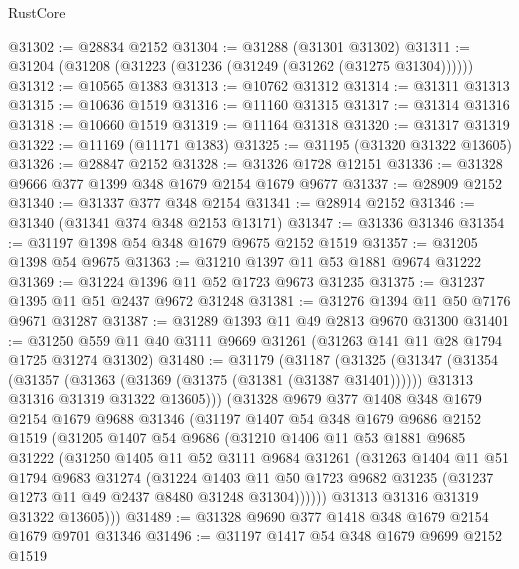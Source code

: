 \begin{lexlean}{RustCore}
\begin{coremodule}
@31302 := @28834 @2152
@31304 := @31288 (@31301 @31302)
@31311 := @31204 (@31208 (@31223 (@31236 (@31249 (@31262 (@31275 @31304))))))
@31312 := @10565 @1383
@31313 := @10762 @31312
@31314 := @31311 @31313
@31315 := @10636 @1519
@31316 := @11160 @31315
@31317 := @31314 @31316
@31318 := @10660 @1519
@31319 := @11164 @31318
@31320 := @31317 @31319
@31322 := @11169 (@11171 @1383)
@31325 := @31195 (@31320 @31322 @13605)
@31326 := @28847 @2152
@31328 := @31326 @1728 @12151
@31336 := @31328 @9666 @377 @1399 @348 @1679 @2154 @1679 @9677
@31337 := @28909 @2152
@31340 := @31337 @377 @348 @2154
@31341 := @28914 @2152
@31346 := @31340 (@31341 @374 @348 @2153 @13171)
@31347 := @31336 @31346
@31354 := @31197 @1398 @54 @348 @1679 @9675 @2152 @1519
@31357 := @31205 @1398 @54 @9675
@31363 := @31210 @1397 @11 @53 @1881 @9674 @31222
@31369 := @31224 @1396 @11 @52 @1723 @9673 @31235
@31375 := @31237 @1395 @11 @51 @2437 @9672 @31248
@31381 := @31276 @1394 @11 @50 @7176 @9671 @31287
@31387 := @31289 @1393 @11 @49 @2813 @9670 @31300
@31401 := @31250 @559 @11 @40 @3111 @9669 @31261 (@31263 @141 @11 @28 @1794 @1725 @31274 @31302)
@31480 := @31179
    (@31187
      (@31325
        (@31347
          (@31354
            (@31357 (@31363 (@31369 (@31375 (@31381 (@31387 @31401))))))
            @31313
            @31316
            @31319
            @31322
            @13605)))
      (@31328
        @9679
        @377
        @1408
        @348
        @1679
        @2154
        @1679
        @9688
        @31346
        (@31197
          @1407
          @54
          @348
          @1679
          @9686
          @2152
          @1519
          (@31205
            @1407
            @54
            @9686
            (@31210
              @1406
              @11
              @53
              @1881
              @9685
              @31222
              (@31250
                @1405
                @11
                @52
                @3111
                @9684
                @31261
                (@31263
                  @1404
                  @11
                  @51
                  @1794
                  @9683
                  @31274
                  (@31224
                    @1403
                    @11
                    @50
                    @1723
                    @9682
                    @31235
                    (@31237 @1273 @11 @49 @2437 @8480 @31248 @31304))))))
          @31313
          @31316
          @31319
          @31322
          @13605)))
@31489 := @31328 @9690 @377 @1418 @348 @1679 @2154 @1679 @9701 @31346
@31496 := @31197 @1417 @54 @348 @1679 @9699 @2152 @1519

\end{coremodule}
\end{lexlean}
